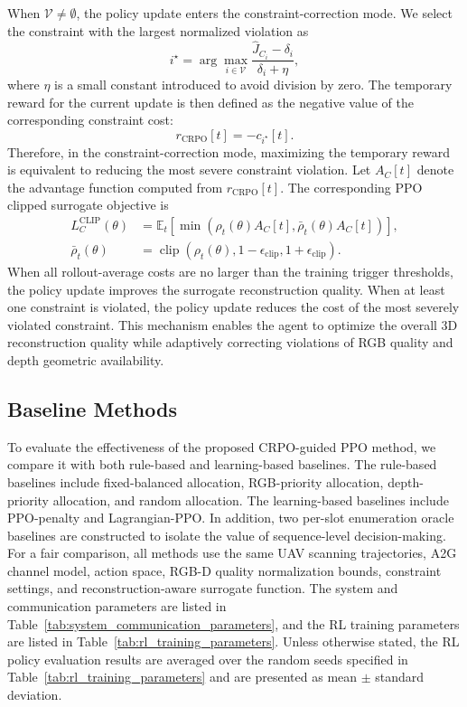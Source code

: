 \documentclass[journal]{IEEEtran}
\begin{document}
When $\mathcal{V}\neq\emptyset$, the policy update enters the constraint-correction mode. We select the constraint with the largest normalized violation as
\begin{equation}
i^{\star}
=
\arg\max_{i\in\mathcal{V}}
\frac{
\hat{J}_{C_i}-\delta_i
}{
\delta_i+\eta
},
\end{equation}
where $\eta$ is a small constant introduced to avoid division by zero. The temporary reward for the current update is then defined as the negative value of the corresponding constraint cost:
\begin{equation}
r_{\mathrm{CRPO}}[t]
=
-c_{i^{\star}}[t].
\end{equation}
Therefore, in the constraint-correction mode, maximizing the temporary reward is equivalent to reducing the most severe constraint violation. Let $A_C[t]$ denote the advantage function computed from $r_{\mathrm{CRPO}}[t]$. The corresponding PPO clipped surrogate objective is
\begin{equation}
\begin{aligned}
L_C^{\mathrm{CLIP}}(\theta)
&=
\mathbb{E}_{t}
\left[
\min
\left(
\rho_t(\theta) A_C[t],
\bar{\rho}_t(\theta) A_C[t]
\right)
\right], \\
\bar{\rho}_t(\theta)
&=
\operatorname{clip}
\left(
\rho_t(\theta),
1-\epsilon_{\mathrm{clip}},
1+\epsilon_{\mathrm{clip}}
\right).
\end{aligned}
\label{eq:ppo_constraint_objective}
\end{equation}
When all rollout-average costs are no larger than the training trigger thresholds, the policy update improves the surrogate reconstruction quality. When at least one constraint is violated, the policy update reduces the cost of the most severely violated constraint. This mechanism enables the agent to optimize the overall 3D reconstruction quality while adaptively correcting violations of RGB quality and depth geometric availability.

\subsection{Baseline Methods}

To evaluate the effectiveness of the proposed CRPO-guided PPO method, we compare it with both rule-based and learning-based baselines. 
The rule-based baselines include fixed-balanced allocation, RGB-priority allocation, depth-priority allocation, and random allocation.
The learning-based baselines include PPO-penalty and Lagrangian-PPO.
In addition, two per-slot enumeration oracle baselines are constructed to isolate the value of sequence-level decision-making.
For a fair comparison, all methods use the same UAV scanning trajectories, A2G channel model, action space, RGB-D quality normalization bounds, constraint settings, and reconstruction-aware surrogate function. 
The system and communication parameters are listed in Table~\ref{tab:system_communication_parameters}, and the RL training parameters are listed in Table~\ref{tab:rl_training_parameters}. 
Unless otherwise stated, the RL policy evaluation results are averaged over the random seeds specified in Table~\ref{tab:rl_training_parameters} and are presented as mean $\pm$ standard deviation.
\end{document}
